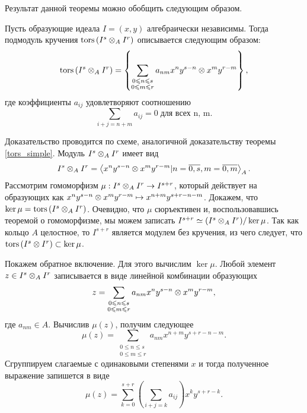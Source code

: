     Результат данной теоремы можно обобщить следующим образом.
    \begin{Theorem}
        Пусть образующие идеала $I = (x, y)$ алгебраически независимы. Тогда подмодуль кручения
        $\textup{tors}\left(I^s \otimes_A I^r\right)$ описывается следующим образом:
        \begin{equation*}
            \textup{tors}\left(I^s \otimes_A I^r\right) = 
                \left\{ \sum_{\substack{0 \leqslant n \leqslant s \\ 0 \leqslant m \leqslant r}}a_{nm}x^ny^{s - n} 
                    \otimes x^my^{r - m}  \right\}, 
        \end{equation*}
        где коэффициенты $a_{ij}$ удовлетворяют соотношению 
        $$\sum_{i + j = n + m} a_{ij} = 0\;\text{для всех n, m}.$$
    \end{Theorem}
    \begin{Proof}
        Доказательство проводится по схеме, аналогичной доказательству теоремы \ref{tors_simple}.
        Модуль $I^s \otimes_A I^r$ имеет вид
        \begin{equation*}
            I^s \otimes_A I^r = \left< x^ny^{s - n} \otimes x^my^{r - m} | 
                n = \overline{0, s}, m = \overline{0, m} \right>_A.
        \end{equation*}
        Рассмотрим гомоморфизм $\mu : I^s \otimes_A I^r \rightarrow I^{s + r}$, который действует на 
        образующих как $x^ny^{s - n} \otimes x^my^{r - m} \mapsto x^{n + m}y^{s + r - n - m}$. 
        Докажем, что $\ker \mu = \textup{tors}\left(I^s \otimes_A I^r\right)$. Очевидно, что $\mu$ сюръективен и, 
        воспользовавшись теоремой о гомоморфизме, мы можем записать 
        $I^{s + r} \simeq (I^s \otimes_A I^r) / \ker \mu$. Так как кольцо $A$ целостное, то $I^{s + r}$
        является модулем без кручения, из чего следует, что $\textup{tors}\left(I^s \otimes I^r\right) \subset \ker \mu$.
        
        Покажем обратное включение. Для этого вычислим $\ker \mu$. Любой элемент $z \in I^s \otimes_A I^r$
        записывается в виде линейной комбинации образующих 
        \begin{equation*}
            z = \sum_{\substack{0 \leqslant n \leqslant s \\ 0 \leqslant m \leqslant r}}a_{nm}x^ny^{s - n} \otimes x^my^{r - m},
        \end{equation*} 
        где $a_{nm} \in A$.
        Вычислив $\mu(z)$, получим следующее
        \begin{equation*}
            \mu(z) = \sum_{\substack{0 \le n \le s \\ 0 \le m \le r}}a_{nm}x^{n + m}y^{s + r - n - m}.
        \end{equation*}
        Сгруппируем слагаемые с одинаковыми степенями $x$ и тогда полученное выражение запишется в виде
        \begin{equation*}
            \mu(z) = \sum_{k = 0}^{s + r}\left( \sum_{i + j = k} a_{ij} \right)x^ky^{s + r - k}.
        \end{equation*}


\end{Proof}
